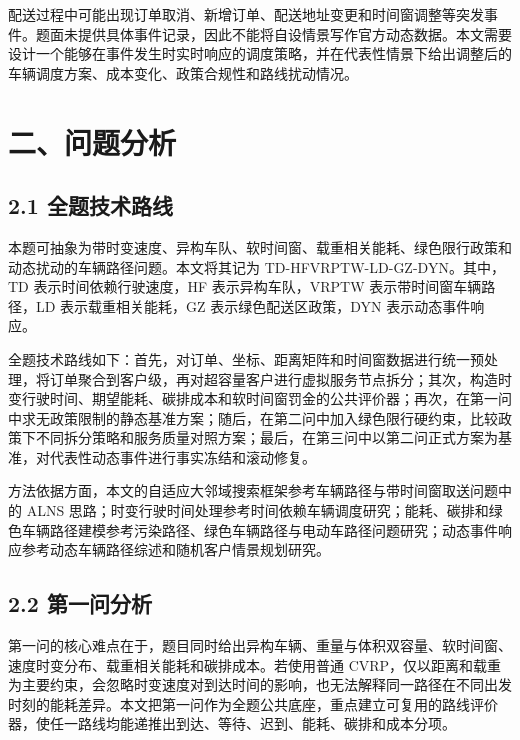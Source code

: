 \documentclass[UTF8,zihao=-4,a4paper]{ctexart}
\begin{document}
配送过程中可能出现订单取消、新增订单、配送地址变更和时间窗调整等突发事件。题面未提供具体事件记录，因此不能将自设情景写作官方动态数据。本文需要设计一个能够在事件发生时实时响应的调度策略，并在代表性情景下给出调整后的车辆调度方案、成本变化、政策合规性和路线扰动情况。


\section{二、问题分析}

\subsection{2.1 全题技术路线}

本题可抽象为带时变速度、异构车队、软时间窗、载重相关能耗、绿色限行政策和动态扰动的车辆路径问题。本文将其记为 TD-HFVRPTW-LD-GZ-DYN。其中，TD 表示时间依赖行驶速度，HF 表示异构车队，VRPTW 表示带时间窗车辆路径，LD 表示载重相关能耗，GZ 表示绿色配送区政策，DYN 表示动态事件响应。

全题技术路线如下：首先，对订单、坐标、距离矩阵和时间窗数据进行统一预处理，将订单聚合到客户级，再对超容量客户进行虚拟服务节点拆分；其次，构造时变行驶时间、期望能耗、碳排成本和软时间窗罚金的公共评价器；再次，在第一问中求无政策限制的静态基准方案；随后，在第二问中加入绿色限行硬约束，比较政策下不同拆分策略和服务质量对照方案；最后，在第三问中以第二问正式方案为基准，对代表性动态事件进行事实冻结和滚动修复。

方法依据方面，本文的自适应大邻域搜索框架参考车辆路径与带时间窗取送问题中的 ALNS 思路\cite{ropke2006alns,pisinger2007general}；时变行驶时间处理参考时间依赖车辆调度研究\cite{ichoua2003time}；能耗、碳排和绿色车辆路径建模参考污染路径、绿色车辆路径与电动车路径问题研究\cite{bektas2011pollution,demir2012alns,erdogan2012green,schneider2014evrptw,goeke2015mixed}；动态事件响应参考动态车辆路径综述和随机客户情景规划研究\cite{bent2004scenario,pillac2013review}。

\subsection{2.2 第一问分析}

第一问的核心难点在于，题目同时给出异构车辆、重量与体积双容量、软时间窗、速度时变分布、载重相关能耗和碳排成本。若使用普通 CVRP，仅以距离和载重为主要约束，会忽略时变速度对到达时间的影响，也无法解释同一路径在不同出发时刻的能耗差异。本文把第一问作为全题公共底座，重点建立可复用的路线评价器，使任一路线均能递推出到达、等待、迟到、能耗、碳排和成本分项。
\end{document}
